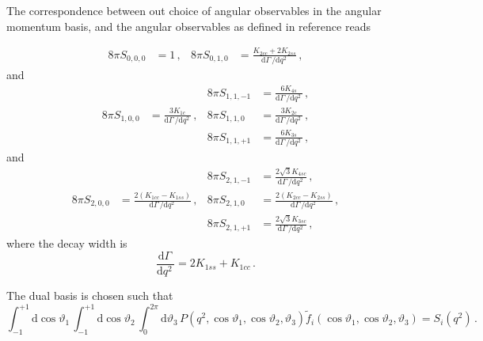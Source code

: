 \documentclass[aps,nofootinbib,preprintnumbers,prd,twocolumn]{revtex4-1}
\newcommand{\dual}[1]{\tilde{#1}}
\newcommand{\rmdx}[1]{\mbox{d} #1 \,} %
\renewcommand{\theta}{\vartheta}
\begin{document}
The correspondence between out choice of angular observables in the angular momentum basis, and the angular
observables as defined in reference \cite{Boer:2014kda} reads
\begin{widetext}
\begin{equation}
\begin{aligned}
    8\pi S_{0, 0,  0} & = 1\,,                                                             &
    8\pi S_{0, 1,  0} & = \frac{K_{2cc} + 2 K_{2ss}}{\rmdx\Gamma/\rmdx{q^2}}\,,
\end{aligned}
\end{equation}
and
\begin{equation}
\begin{aligned}
%
                      &                                                                    &
    8\pi S_{1, 1, -1} & = \frac{6 K_{4s}}{\rmdx\Gamma/\rmdx{q^2}}\,,                       \\
%
    8\pi S_{1, 0,  0} & = \frac{3 K_{1c}}{\rmdx\Gamma/\rmdx{q^2}}\,,                       &
    8\pi S_{1, 1,  0} & = \frac{3 K_{2c}}{\rmdx\Gamma/\rmdx{q^2}}\,,                       \\
%
                      &                                                                    &
    8\pi S_{1, 1, +1} & = \frac{6 K_{3s}}{\rmdx\Gamma/\rmdx{q^2}}\,,
\end{aligned}
\end{equation}
and
\begin{equation}
\begin{aligned}
%
                      &                                                                    &
    8\pi S_{2, 1, -1} & = \frac{2 \sqrt{3} K_{4sc}}{\rmdx\Gamma/\rmdx{q^2}}\,,             \\
%
    8\pi S_{2, 0,  0} & = \frac{2(K_{1cc} - K_{1ss})}{\rmdx\Gamma/\rmdx{q^2}}\,,           &
    8\pi S_{2, 1,  0} & = \frac{2(K_{2cc} - K_{2ss})}{\rmdx\Gamma/\rmdx{q^2}}\,,           \\
%
                      &                                                                    &
    8\pi S_{2, 1, +1} & = \frac{2 \sqrt{3} K_{3sc}}{\rmdx\Gamma/\rmdx{q^2}}\,,
\end{aligned}
\end{equation}
where the decay width is
\begin{equation}
    \frac{\rmdx{\Gamma}} {\rmdx{q^2}} = 2 K_{1ss} + K_{1cc}\,.
\end{equation}

The dual basis is chosen such that
\begin{equation}
    \int_{-1}^{+1} \rmdx{\cos \theta_1} \int_{-1}^{+1} \rmdx{\cos \theta_2} \int_0^{2\pi} \rmdx{\theta_3} P(q^2, \cos \theta_1, \cos \theta_2, \theta_3) \dual{f}_i(\cos \theta_1, \cos \theta_2, \theta_3) = S_i(q^2)\,.
\end{equation}
\end{widetext}
\end{document}
